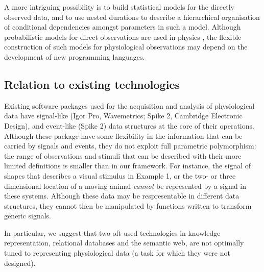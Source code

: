 A more intriguing possibility is to build statistical models for the
directly observed data, and to use nested durations to describe a
hierarchical organisation of conditional dependencies amongst
parameters in such a model. Although probabilistic models for direct
observations are used in physics \citep{Daniell1991}, the flexible
construction of such models for physiological observations may depend
on the development of new programming languages.

\subsection*{Relation to existing technologies}

Existing software packages used for the acquisition and analysis of
physiological data have signal-like (Igor Pro, Wavemetrics; Spike 2,
Cambridge Electronic Design), and event-like (Spike 2) data structures
at the core of their operations. Although these package have some
flexibility in the information that can be carried by signals and
events, they do not exploit full parametric polymorphism: the range of
observations and stimuli that can be described with their more limited
definitions is smaller than in our framework. For instance, the signal
of shapes that describes a visual stimulus in Example 1, or the two-
or three dimensional location of a moving animal \emph{cannot} be
represented by a signal in these systems. Although these data may be
respresentable in different data structures, they cannot then be
manipulated by functions written to transform generic signals.

In particular, we suggest that two oft-used technologies in knowledge
representation, relational databases and the semantic web, are not
optimally tuned to representing physiological data (a task for which
they were not designed).

